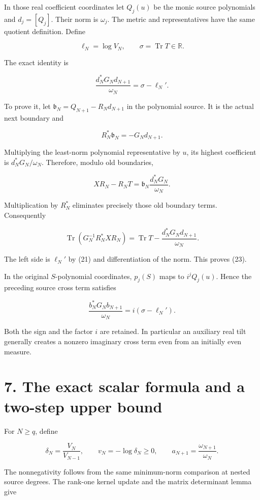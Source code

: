 \documentclass[
  11pt,
]{article}
\begin{document}
In those real coefficient coordinates let \(Q_j(u)\) be the monic source
polynomials and \(d_j=[Q_j]\). Their norm is \(\omega_j\). The metric
and representatives have the same quotient definition. Define

\[
\ell_N=\log V_N,\qquad \sigma=\operatorname{Tr}T\in\mathbb R.
\]

The exact identity is

\[
\boxed{\frac{d_N^*G_Nd_{N+1}}{\omega_N}=\sigma-\ell_N'.}
\tag{23}
\]

To prove it, let \(\mathfrak b_N=Q_{N+1}-R_Nd_{N+1}\) in the polynomial
source. It is the actual next boundary and

\[
R_N^*\mathfrak b_N=-G_Nd_{N+1}.
\]

Multiplying the least-norm polynomial representative by \(u\), its
highest coefficient is \(d_N^*G_N/\omega_N\). Therefore, modulo old
boundaries,

\[
XR_N-R_NT=\mathfrak b_N\frac{d_N^*G_N}{\omega_N}.
\]

Multiplication by \(R_N^*\) eliminates precisely those old boundary
terms. Consequently

\[
\operatorname{Tr}(G_N^{-1}R_N^*XR_N)
=\operatorname{Tr}T-\frac{d_N^*G_Nd_{N+1}}{\omega_N}.
\]

The left side is \(\ell_N'\) by (21) and differentiation of the norm.
This proves (23).

In the original \(S\)-polynomial coordinates, \(p_j(S)\) maps to
\(i^jQ_j(u)\). Hence the preceding source cross term satisfies

\[
\boxed{\frac{b_N^*G_Nb_{N+1}}{\omega_N}=i(\sigma-\ell_N').}
\tag{24}
\]

Both the sign and the factor \(i\) are retained. In particular an
auxiliary real tilt generally creates a nonzero imaginary cross term
even from an initially even measure.

\section{7. The exact scalar formula and a two-step upper
bound}\label{the-exact-scalar-formula-and-a-two-step-upper-bound}

For \(N\ge q\), define

\[
\delta_N=\frac{V_N}{V_{N-1}},\qquad v_N=-\log\delta_N\ge0,
\qquad a_{N+1}=\frac{\omega_{N+1}}{\omega_N}.
\]

The nonnegativity follows from the same minimum-norm comparison at
nested source degrees. The rank-one kernel update and the matrix
determinant lemma give
\end{document}
